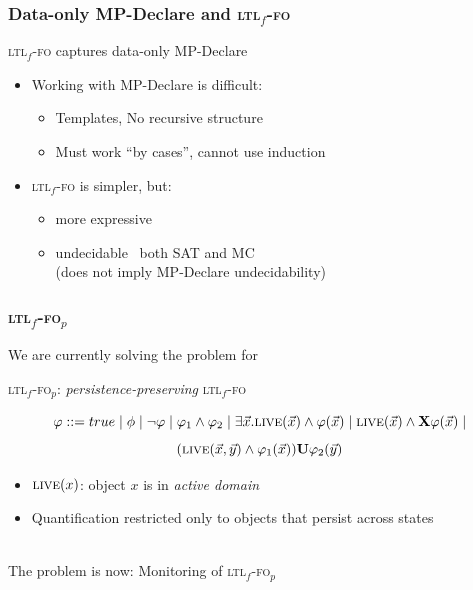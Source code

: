 \documentclass{beamer}
\newcommand{\nextX}{\mathbf{X}\xspace}
\newcommand{\ltlX}{\nextX}
\newcommand{\ltlU}{\mathbf{U}}
\newcommand{\true}{true}
\newcommand{\live}{\textsc{live}}
\newcommand{\ltlf}{\textsc{ltl}$_f$\xspace}
\newcommand{\ltlffo}{\ltlf-\textsc{fo}\xspace}
\newcommand{\ltlffop}{\ltlf-\textsc{fo}$_p$\xspace}
\begin{document}
\begin{frame}
\frametitle{Data-only MP-Declare and \ltlffo}

\ltlffo captures data-only MP-Declare

\begin{itemize}	
	\item Working with MP-Declare is difficult:
	\begin{itemize}	
		\item Templates, No recursive structure
		\item Must work ``by cases'', cannot use induction
	\end{itemize}
	
	\item \ltlffo is simpler, but:
	\begin{itemize}	
		\item more expressive
		\item undecidable~\cite{} both SAT and MC\\ 
			(does not imply MP-Declare undecidability)
	\end{itemize}
\end{itemize}

\end{frame}



\begin{frame}
\frametitle{\ltlffop}

We are currently solving the problem for 
\begin{center}
	\ltlffop: \emph{persistence-preserving} \ltlffo
\end{center}
\[\varphi ::= \true \mid \phi \mid \lnot \varphi \mid \varphi_1 \land \varphi_2 \mid 
\exists \vec x.\live(\vec x)\land\varphi(\vec x) \mid
\live(\vec x)\land \ltlX\varphi(\vec x)  \mid\]
\[(\live(\vec x, \vec y)\land \varphi_1(\vec x)) \ltlU \varphi_2(\vec y)\]
\begin{itemize}	
	\item $\live(x)$: object $x$ is in \emph{active domain}
	\item Quantification restricted only to objects that persist across states
\end{itemize}

~\\

The problem is now: Monitoring of  \ltlffop

\end{frame}
\end{document}
